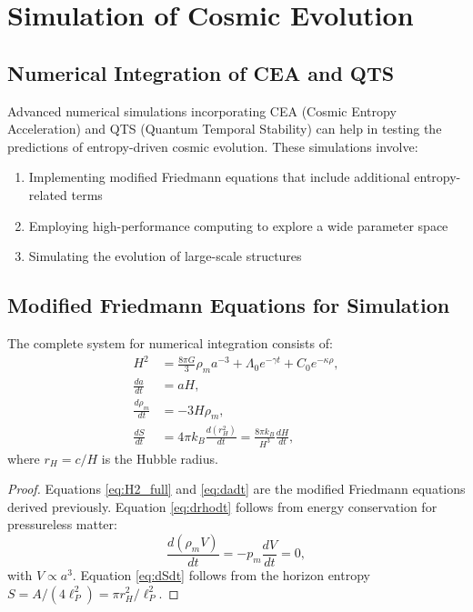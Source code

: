 \section{Simulation of Cosmic Evolution}

\subsection{Numerical Integration of CEA and QTS}

Advanced numerical simulations incorporating CEA (Cosmic Entropy Acceleration) and QTS (Quantum Temporal Stability) can help in testing the predictions of entropy-driven cosmic evolution. These simulations involve:

\begin{enumerate}
\item Implementing modified Friedmann equations that include additional entropy-related terms
\item Employing high-performance computing to explore a wide parameter space
\item Simulating the evolution of large-scale structures
\end{enumerate}

\subsection{Modified Friedmann Equations for Simulation}

\begin{theorem}
The complete system for numerical integration consists of:
\begin{align}
H^2 &= \frac{8\pi G}{3}\rho_m a^{-3} + \Lambda_0 e^{-\gamma t} + C_0 e^{-\kappa \rho}, \label{eq:H2_full} \\
\frac{da}{dt} &= aH, \label{eq:dadt} \\
\frac{d\rho_m}{dt} &= -3H\rho_m, \label{eq:drhodt} \\
\frac{dS}{dt} &= 4\pi k_B \frac{d(r_H^2)}{dt} = \frac{8\pi k_B}{H^3}\frac{dH}{dt}, \label{eq:dSdt}
\end{align}
where $r_H = c/H$ is the Hubble radius.
\end{theorem}

\begin{proof}
Equations \eqref{eq:H2_full} and \eqref{eq:dadt} are the modified Friedmann equations derived previously. Equation \eqref{eq:drhodt} follows from energy conservation for pressureless matter:
\[
\frac{d(\rho_m V)}{dt} = -p_m \frac{dV}{dt} = 0,
\]
with $V \propto a^3$. Equation \eqref{eq:dSdt} follows from the horizon entropy $S = A/(4\ell_P^2) = \pi r_H^2/\ell_P^2$.
\end{proof}

